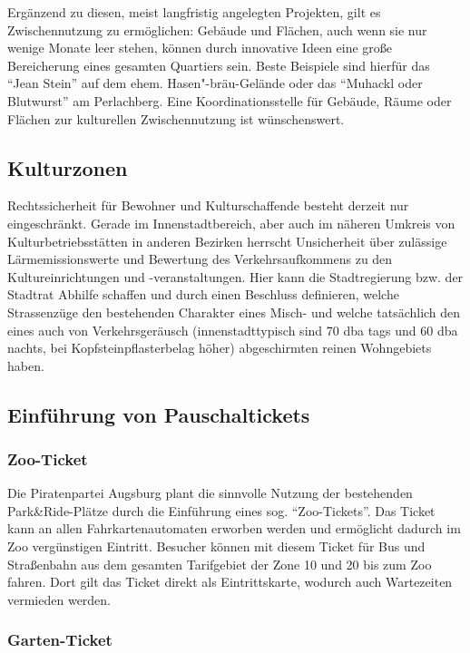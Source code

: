   Ergänzend zu diesen, meist langfristig angelegten Projekten, gilt es 
  Zwischennutzung zu ermöglichen: Gebäude und Flächen, auch wenn sie nur 
  wenige Monate leer stehen, können durch innovative Ideen eine große 
  Bereicherung eines gesamten Quartiers sein. Beste Beispiele sind hierfür 
  das "`Jean Stein"' auf dem ehem. Hasen"-bräu-Gelände oder das "`Muhackl oder 
  Blutwurst"' am Perlachberg. Eine Koordinationsstelle für Gebäude, Räume oder 
  Flächen zur kulturellen Zwischennutzung ist wünschenswert.
  
  \subsection{Kulturzonen}
  
  Rechtssicherheit für Bewohner und Kulturschaffende besteht derzeit nur 
  eingeschränkt. Gerade im Innenstadtbereich, aber auch im näheren Umkreis 
  von Kulturbetriebsstätten in anderen Bezirken herrscht Unsicherheit über 
  zulässige Lärmemissionswerte und Bewertung des Verkehrsaufkommens zu den 
  Kultureinrichtungen und -veranstaltungen. Hier kann die Stadtregierung bzw. 
  der Stadtrat Abhilfe schaffen und durch einen Beschluss definieren, welche 
  Strassenzüge den bestehenden Charakter eines Misch- und welche tatsächlich 
  den eines auch von Verkehrsgeräusch (innenstadttypisch sind 70 dba tags und 
  60 dba nachts, bei Kopfsteinpflasterbelag höher) abgeschirmten reinen 
  Wohngebiets haben.
  
  \subsection{Einführung von Pauschaltickets}
  
  \subsubsection{Zoo-Ticket}
  
  Die Piratenpartei Augsburg plant die sinnvolle Nutzung der bestehenden 
  Park\&Ride-Plätze durch die Einführung eines sog. "`Zoo-Tickets"'. Das 
  Ticket 
  kann an allen Fahrkartenautomaten erworben werden und ermöglicht dadurch im 
  Zoo vergünstigen Eintritt. Besucher können mit diesem Ticket für Bus und 
  Straßenbahn aus dem gesamten Tarifgebiet der Zone 10 und 20 bis zum Zoo 
  fahren. Dort gilt das Ticket direkt als Eintrittskarte, wodurch auch 
  Wartezeiten vermieden werden.
  
  \subsubsection{Garten-Ticket}
  
